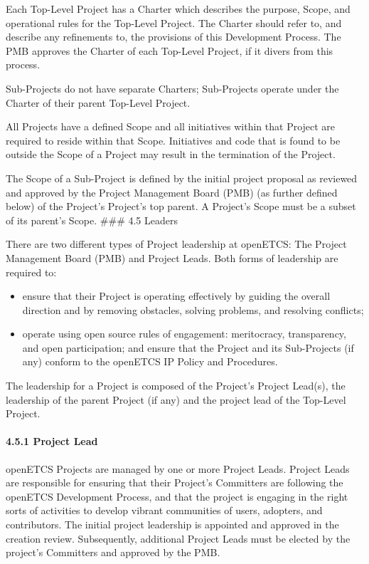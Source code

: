 Each Top-Level Project has a Charter which describes the purpose, Scope,
and operational rules for the Top-Level Project. The Charter should
refer to, and describe any refinements to, the provisions of this
Development Process. The PMB approves the Charter of each Top-Level
Project, if it divers from this process.

Sub-Projects do not have separate Charters; Sub-Projects operate under
the Charter of their parent Top-Level Project.

All Projects have a defined Scope and all initiatives within that
Project are required to reside within that Scope. Initiatives and code
that is found to be outside the Scope of a Project may result in the
termination of the Project.

The Scope of a Sub-Project is defined by the initial project proposal as
reviewed and approved by the Project Management Board (PMB) (as further
defined below) of the Project's Project's top parent. A Project's Scope
must be a subset of its parent's Scope. \#\#\# 4.5 Leaders

There are two different types of Project leadership at openETCS: The
Project Management Board (PMB) and Project Leads. Both forms of
leadership are required to:

\begin{itemize}

\item
  ensure that their Project is operating effectively by guiding the
  overall direction and by removing obstacles, solving problems, and
  resolving conflicts;
\item
  operate using open source rules of engagement: meritocracy,
  transparency, and open participation; and ensure that the Project and
  its Sub-Projects (if any) conform to the openETCS IP Policy and
  Procedures.
\end{itemize}

The leadership for a Project is composed of the Project's Project
Lead(s), the leadership of the parent Project (if any) and the project
lead of the Top-Level Project.

\paragraph{4.5.1 Project Lead}\label{project-lead}

openETCS Projects are managed by one or more Project Leads. Project
Leads are responsible for ensuring that their Project's Committers are
following the openETCS Development Process, and that the project is
engaging in the right sorts of activities to develop vibrant communities
of users, adopters, and contributors. The initial project leadership is
appointed and approved in the creation review. Subsequently, additional
Project Leads must be elected by the project's Committers and approved
by the PMB.

